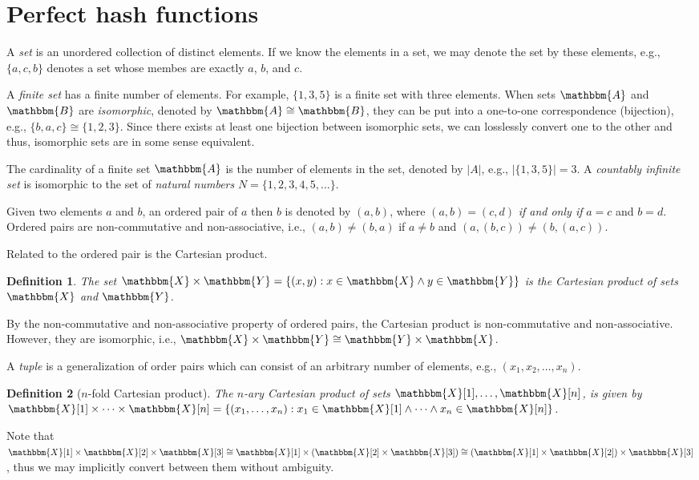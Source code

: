 \documentclass[hidelinks,11pt,final]{article}
\newcommand{\envnumstyle}{section}
\theoremstyle{plain}
\newtheorem{definition}{Definition}[\envnumstyle]
\begin{document}
\section{Perfect hash functions}
A \emph{set} is an unordered collection of distinct elements.
If we know the elements in a set, we may denote the set by these elements, e.g., $\{a,c,b\}$ denotes a set whose membes are exactly $a$, $b$, and $c$.

A \emph{finite set} has a finite number of elements.
For example, $\{ 1, 3, 5 \}$ is a finite set with three elements.
When sets $\mathbbm{A}$ and $\mathbbm{B}$ are \emph{isomorphic}, denoted by $\mathbbm{A} 
\cong \mathbbm{B}$, they can be put into a one-to-one correspondence (bijection), e.g., $\{b,a,c\} \cong \{1,2,3\}$.
Since there exists at least one bijection between isomorphic sets, we can losslessly convert one to the other and thus, isomorphic sets are in some sense equivalent.

The cardinality of a finite set $\mathbbm{A}$ is the number of elements in the set, denoted by $|A|$, e.g., $|\{ 1, 3, 5\}| = 3$.
A \emph{countably infinite set} is isomorphic to the set of \emph{natural numbers} $N = \{1,2,3,4,5,\ldots\}$.

Given two elements $a$ and $b$, an ordered pair of $a$ then $b$ is denoted by $(a,b)$, where $(a,b) = (c,d)$ \emph{if and only if} $a = c$ and $b = d$.
Ordered pairs are non-commutative and non-associative, i.e., $(a,b) \neq (b,a)$ if $a \neq b$ and $(a,(b,c)) \neq (b,(a,c))$.

Related to the ordered pair is the Cartesian product.
\begin{definition}
The set $\mathbbm{X} \times \mathbbm{Y} = \left\{(x,y) : x \in 
\mathbbm{X} \land y \in \mathbbm{Y}\right\}$ is the Cartesian product of sets $\mathbbm{X}$ 
and $\mathbbm{Y}$.
\end{definition}
By the non-commutative and non-associative property of ordered pairs, the Cartesian product is non-commutative and non-associative.
However, they are isomorphic, i.e., $\mathbbm{X} \times \mathbbm{Y} \cong \mathbbm{Y} \times \mathbbm{X}$.

A \emph{tuple} is a generalization of order pairs which can consist of an arbitrary number of elements, e.g., $(x_1,x_2,\ldots,x_n)$.
\begin{definition}[$n$-fold Cartesian product]
The $n$-ary Cartesian product of sets $\mathbbm{X}[1],\ldots,\mathbbm{X}[n]$, is given by $\mathbbm{X}[1] \times \cdots \times \mathbbm{X}[n] = \left\{(x_1,\ldots,x_n) : x_1 \in \mathbbm{X}[1] \land \cdots \land x_n \in \mathbbm{X}[n]\right\}$.
\end{definition}
Note that $\mathbbm{X}[1] \times \mathbbm{X}[2] \times \mathbbm{X}[3] \cong \mathbbm{X}[1] \times \left(\mathbbm{X}[2] \times \mathbbm{X}[3]\right) \cong \left(\mathbbm{X}[1] \times \mathbbm{X}[2]\right) \times \mathbbm{X}[3]$, thus we may implicitly convert between them without ambiguity.
\end{document}
